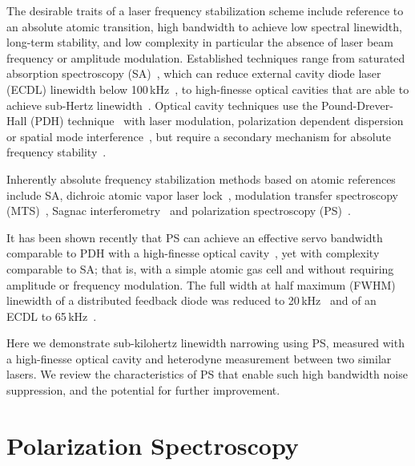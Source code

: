 \documentclass[10pt,letterpaper]{article}
\begin{document}
The desirable traits of a laser frequency stabilization scheme include reference to an absolute atomic transition, high bandwidth to achieve low spectral linewidth, long-term stability, and low complexity in particular the absence of laser beam frequency or amplitude modulation.
Established techniques range from saturated absorption spectroscopy (SA)~\cite{maguire_theoretical_2006, haroche_theory_1972, preston_doppler-free_1996}, which can reduce external cavity diode laser (ECDL) linewidth below 100\,kHz~\cite{cuneo_optically_1994, saliba_linewidths_2009}, to high-finesse optical cavities that are able to achieve sub-Hertz linewidth~\cite{drever_laser_1983,ludlow_compact_2007}.
Optical cavity techniques use the Pound-Drever-Hall (PDH) technique~\cite{drever_laser_1983} with laser modulation, polarization dependent dispersion~\cite{hansch_laser_1980} or spatial mode interference~\cite{tiltlock}, but require a secondary mechanism for absolute frequency stability~\cite{robins_Interferometric_2002}.

Inherently absolute frequency stabilization methods based on atomic references include SA, dichroic atomic vapor laser lock~\cite{corwin_frequency-stabilized_1998,millett-sikking_davll_2007}, modulation transfer spectroscopy (MTS)~\cite{shirley_modulation_1982,mccarron_modulation_2008,negnevitsky_wideband_2013}, Sagnac interferometry~\cite{robins_Interferometric_2002,jundt_non-linear_2003} and polarization spectroscopy (PS)~\cite{wieman_doppler-free_1976, demtroder_laser_2003}.

It has been shown recently that PS can achieve an effective servo bandwidth comparable to PDH with a high-finesse optical cavity~\cite{torii_laser-phase_2012,yoshikawa_frequency_2003}, yet with complexity comparable to SA; that is, with a simple atomic gas cell and without requiring amplitude or frequency modulation.
The full width at half maximum (FWHM) linewidth of a distributed feedback diode was reduced to 20\,kHz~\cite{torii_laser-phase_2012} and of an ECDL to 65\,kHz~\cite{yoshikawa_frequency_2003}.

Here we demonstrate sub-kilohertz linewidth narrowing using PS, measured with a high-finesse optical cavity and heterodyne measurement between two similar lasers.
We review the characteristics of PS that enable such high bandwidth noise suppression, and the potential for further improvement.

\section{Polarization Spectroscopy}
\end{document}
